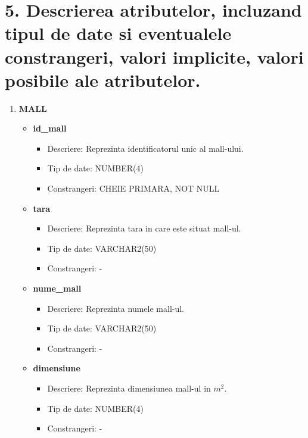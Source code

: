 
\section*{5. Descrierea atributelor, incluzand tipul de date si eventualele constrangeri, valori implicite, valori posibile ale atributelor.}
\vspace{1cm}
\begin{enumerate}

    \item \textbf{MALL}
    \begin{itemize}
    
        \item \textbf{id\_mall }
                \begin{itemize}
                    \item Descriere: Reprezinta identificatorul unic al mall-ului.
                    \item Tip de date: NUMBER(4)
                    \item Constrangeri: CHEIE PRIMARA, NOT NULL
                \end{itemize}
                
        \item \textbf{tara}
                \begin{itemize}
                    \item Descriere: Reprezinta tara in care este situat mall-ul.
                    \item Tip de date: VARCHAR2(50)
                    \item Constrangeri: -
                \end{itemize}

        \item \textbf{nume\_mall}
                \begin{itemize}
                    \item Descriere: Reprezinta numele mall-ul.
                    \item Tip de date: VARCHAR2(50)
                    \item Constrangeri: -
                \end{itemize}
                
        \item \textbf{dimensiune}
                \begin{itemize}
                    \item Descriere: Reprezinta dimensiunea mall-ul in $m^{2}$.
                    \item Tip de date: NUMBER(4)
                    \item Constrangeri: -
                \end{itemize}


\end{itemize}
\end{enumerate}
